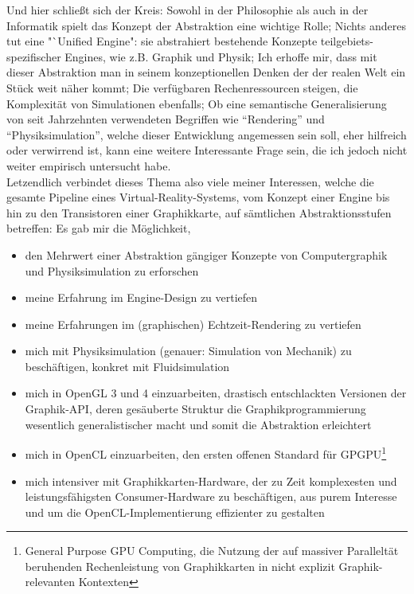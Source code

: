 Und hier schließt sich der Kreis: Sowohl in der Philosophie als auch in der Informatik spielt das Konzept der Abstraktion eine wichtige Rolle; Nichts anderes tut eine "`Unified Engine": sie abstrahiert bestehende Konzepte teilgebiets-spezifischer Engines, wie z.B. Graphik und Physik; Ich erhoffe mir, dass mit dieser Abstraktion man in seinem konzeptionellen Denken der der realen Welt ein Stück weit näher kommt; Die verfügbaren Rechenressourcen steigen, die Komplexität von Simulationen ebenfalls; Ob eine semantische Generalisierung von seit Jahrzehnten verwendeten Begriffen wie "`Rendering"' und "`Physiksimulation"', welche dieser Entwicklung angemessen sein soll, eher hilfreich oder verwirrend ist, kann eine weitere Interessante Frage sein, die ich jedoch nicht weiter empirisch untersucht habe.\\

Letzendlich verbindet dieses Thema also viele meiner Interessen, welche die gesamte Pipeline eines Virtual-Reality-Systems,  vom Konzept einer Engine bis hin zu den Transistoren einer Graphikkarte, auf sämtlichen Abstraktionsstufen betreffen: Es gab mir die Möglichkeit,
\begin{itemize}
	\item den Mehrwert einer Abstraktion gängiger Konzepte von Computergraphik und Physiksimulation zu erforschen
	\item meine Erfahrung im Engine-Design zu vertiefen
	\item meine Erfahrungen im (graphischen) Echtzeit-Rendering zu vertiefen
	\item mich mit Physiksimulation (genauer: Simulation von Mechanik) zu beschäftigen, konkret mit Fluidsimulation
	
	\item mich in OpenGL 3 und 4 einzuarbeiten, drastisch entschlackten Versionen der Graphik-API, deren gesäuberte Struktur die Graphikprogrammierung wesentlich generalistischer macht und somit die Abstraktion erleichtert
	\item mich in OpenCL einzuarbeiten, den ersten offenen Standard für \linebreak GPGPU\footnote{General Purpose GPU Computing, die Nutzung der auf massiver Paralleltät beruhenden Rechenleistung von Graphikkarten in nicht explizit Graphik-relevanten Kontexten}
	\item  mich intensiver mit Graphikkarten-Hardware, der zu Zeit komplexesten und leistungsfähigsten Consumer-Hardware zu beschäftigen, aus purem Interesse und um die OpenCL-Implementierung effizienter zu gestalten

\end{itemize}

 

\clearpage
